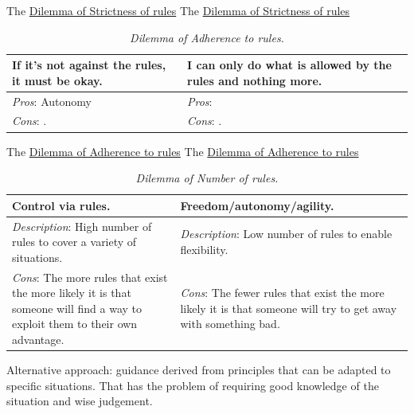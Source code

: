 The \href{table:rule_strictness}{Dilemma of Strictness of rules}
The \href{table:rule_strictness}{Dilemma of Strictness of rules}


\begin{center}
\begin{table}[H] %
\begin{tabular}{ | m{\dilemmatablewidth}| m{\dilemmatablewidth} | } 
  \hline
  \textbf{If it's not against the rules, it must be okay.} & 
  \textbf{I can only do what is allowed by the rules and nothing more.} \\ 
  \hline
  \textit{Pros}: Autonomy &
  \textit{Pros}:  \\
  \hline
  \textit{Cons}: . & 
  \textit{Cons}: .  \\  
  \hline
\end{tabular}
\caption{
\textit{Dilemma of Adherence to rules.}
}
\label{table:rule_adherence}
\end{table}
\end{center}


The \href{table:rule_adherence}{Dilemma of Adherence to rules}
The \href{table:rule_adherence}{Dilemma of Adherence to rules}



\begin{center}
\begin{table}[H] %
\begin{tabular}{ | m{\dilemmatablewidth}| m{\dilemmatablewidth} | } 
  \hline
  \textbf{Control via rules.} & \textbf{Freedom/autonomy/agility.} \\ 
  \hline
  \textit{Description}: High number of rules to cover a variety of situations. & 
  \textit{Description}: Low number of rules to enable flexibility. \\ 
  \hline
  \textit{Cons}: The more rules that exist the more likely it is that someone will find a way to exploit them to their own advantage. & 
  \textit{Cons}: The fewer rules that exist the more likely it is that someone will try to get away with something bad. \\  
  \hline
\end{tabular}
\caption{
\textit{Dilemma of Number of rules.}
}
\label{table:number_of_rules}
\end{table}
\end{center}
Alternative approach: guidance derived from principles that can be adapted to specific situations. That has the problem of requiring good knowledge of the situation and wise judgement.

